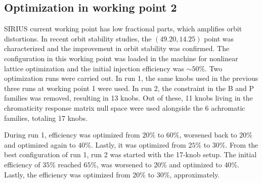 \documentclass[a4paper,
               keeplastbox,   %
               ]{jacow}
\begin{document}
\subsection{Optimization in working point 2}
 SIRIUS current working point has low fractional parts, which amplifies orbit distortions. In recent orbit stability studies, the $(49.20, 14.25)$ point was characterized and the improvement in orbit stability was confirmed. The configuration in this working point was loaded in the machine for nonlinear lattice optimization and the initial injection efficiency was $\sim50\%$. Two optimization runs were carried out. In run 1, the same knobs used in the previous three runs at working point 1 were used. In run 2, the constraint in the B and P families was removed, resulting in 13 knobs. Out of these, 11 knobs living in the chromaticity response matrix null space were used alongside the 6 achromatic families, totaling 17 knobs. 
 
 During run 1, efficiency was optimized from $20\%$ to $60\%$, worsened back to $20\%$ and optimized again to $40\%$. Lastly, it was optimized from $25\%$ to $30\%$. From the best configuration  of run 1, run 2 was started with the 17-knob setup. The initial efficiency of $35\%$ reached $65\%$, was worsened to $20\%$ and optimized to $40\%$. Lastly, the efficiency was optimized from $20\%$ to $30\%$, approximately.
\end{document}
